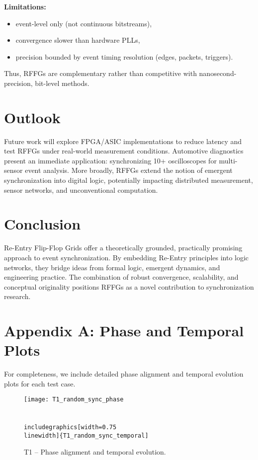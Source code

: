 \documentclass[11pt]{article}
\begin{document}
\textbf{Limitations:}
\begin{itemize}
  \item event-level only (not continuous bitstreams),
  \item convergence slower than hardware PLLs,
  \item precision bounded by event timing resolution (edges, packets, triggers).
\end{itemize}

Thus, RFFGs are complementary rather than competitive with nanosecond-precision, bit-level methods.

\section{Outlook}
Future work will explore FPGA/ASIC implementations to reduce latency and test RFFGs under real-world measurement conditions. Automotive diagnostics present an immediate application: synchronizing 10+ oscilloscopes for multi-sensor event analysis. More broadly, RFFGs extend the notion of emergent synchronization into digital logic, potentially impacting distributed measurement, sensor networks, and unconventional computation.

\section{Conclusion}
Re-Entry Flip-Flop Grids offer a theoretically grounded, practically promising approach to event synchronization. By embedding Re-Entry principles into logic networks, they bridge ideas from formal logic, emergent dynamics, and engineering practice. The combination of robust convergence, scalability, and conceptual originality positions RFFGs as a novel contribution to synchronization research.

\appendix
\section*{Appendix A: Phase and Temporal Plots}

For completeness, we include detailed phase alignment and temporal evolution plots for each test case.

\begin{figure}[htbp!]
  \centering
  \texttt{[image: T1\_random\_sync\_phase\\\\[4pt]
  \\includegraphics[width=0.75\\linewidth]\{T1\_random\_sync\_temporal]}
  \caption{T1 -- Phase alignment and temporal evolution.}
\end{figure}
\end{document}
